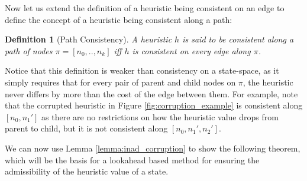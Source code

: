 \documentclass[letterpaper]{article}
\newtheorem{definition}{Definition}
\begin{document}
Now let us extend the definition of a heuristic being consistent on an edge to define the concept of a heuristic being consistent along a path:

\begin{definition}[Path Consistency]
A heuristic $h$ is said to be consistent along a path of nodes $\pi=[n_0,..,n_k]$ iff $h$ is consistent on every edge along $\pi$.
\end{definition}
Notice that this definition is weaker than consistency on a state-space, as it simply requires that for every pair of parent and child nodes on $\pi$, the heuristic never differs by more than the cost of the edge between them.
For example, note that the corrupted heuristic in Figure \ref{fig:corruption_example} is consistent along $[n_0, n_1']$ as there are no restrictions on how the heuristic value drops from parent to child, but it is not consistent along $[n_0, n_1', n_2']$.

We can now use Lemma \ref{lemma:inad_corruption} to show the following theorem, which will be the basis for a lookahead based method for ensuring the admissibility of the heuristic value of a state.
\end{document}
